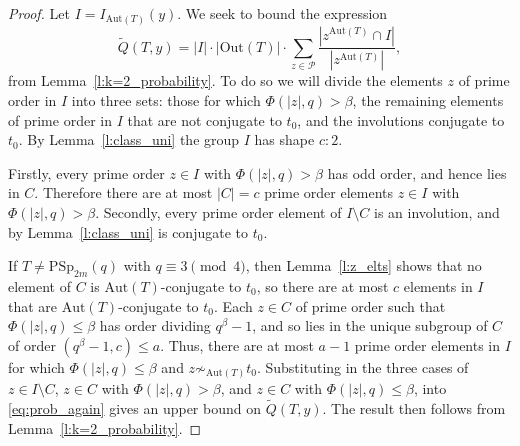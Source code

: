 \documentclass[twoside,a4paper,reqno,11pt]{amsart}
\newcommand{\<}{\langle}
\renewcommand{\>}{\rangle}
\newcommand{\leqs}{\leqslant}
\newcommand{\Aut}{\mathrm{Aut}}
\newcommand{\PSp}{\mathrm{PSp}}
\theoremstyle{definition}
\begin{document}
\begin{proof}
Let $I = I_{\Aut(T)}(y)$. We seek to bound the expression
\begin{equation}\label{eq:prob_again}
\widetilde{Q}(T,y) = |I|\cdot|\mathrm{Out}(T)|\cdot \sum_{z\in\mathcal{P}}\frac{|z^{\mathrm{Aut}(T)}\cap I|}{|z^{\mathrm{Aut}(T)}|},
\end{equation}
from Lemma~\ref{l:k=2_probability}. To do so we will divide the elements $z$ of prime order in $I$ into three sets: those for which  $\Phi(|z|, q) > \beta$, the remaining elements of prime order in $I$ %
that are not conjugate to $t_0$, and the involutions conjugate to $t_0$. By Lemma~\ref{l:class_uni} the group $I$ has shape $c{:}2$.

Firstly, every prime order $z\in I$ with $\Phi(|z|,q) > \beta$ has odd order, and hence lies in $C$. Therefore there are at most $|C| = c$ prime order elements $z\in I$ with $\Phi(|z|,q) > \beta$. Secondly, every prime order element of $I \setminus C$  is an involution, and by Lemma~\ref{l:class_uni} is conjugate to $t_0$.  

If $T \neq \PSp_{2m}(q)$ with $q \equiv 3 \pmod 4$, then Lemma~\ref{l:z_elts} shows that no element of $C$ is $\Aut(T)$-conjugate to $t_0$, so there are at most $c$ elements in $I$ that are $\Aut(T)$-conjugate to $t_0$. Each  $z\in C$ of prime order such that $\Phi(|z|,q) \leqs \beta$ has order dividing $q^\beta -1$, and so lies in the unique subgroup of $C$ of order $(q^\beta-1,c) \leqs a$. Thus, there are at most $a-1$ prime order elements in $I$ for which $\Phi(|z|,q) \leqs \beta$ and $z \not\sim_{\Aut(T)} t_0$.
Substituting in the three cases of $z \in I \setminus C$, $z\in C$ with $\Phi(|z|,q) > \beta$, and $z\in C$ with $\Phi(|z|,q) \leqs \beta$, into \eqref{eq:prob_again} gives an upper bound on $\widetilde{Q}(T,y)$. The result then follows from Lemma~\ref{l:k=2_probability}.


\end{proof}
\end{document}
